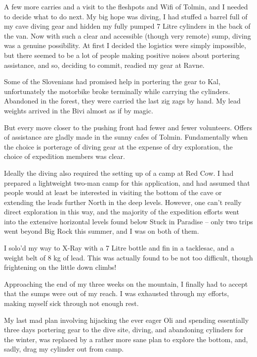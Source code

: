 A few more carries and a visit to the fleshpots and Wifi of Tolmin, and
I needed to decide what to do next. My big hope was diving, I had
stuffed a barrel full of my cave diving gear and hidden my fully pumped
7 Litre cylinders in the back of the van. Now with such a clear and
accessible (though very remote) sump, diving was a genuine possibility.
At first I decided the logistics were simply impossible, but there
seemed to be a lot of people making positive noises about portering
assistance, and so, deciding to commit, readied my gear at Ravne.

Some of the Slovenians had promised help in portering the gear to Kal,
unfortunately the motorbike broke terminally while carrying the
cylinders. Abandoned in the forest, they were carried the last zig zags
by hand. My lead weights arrived in the Bivi almost as if by magic.

But every move closer to the pushing front had fewer and fewer
volunteers. Offers of assistance are gladly made in the sunny cafes of
Tolmin. Fundamentally when the choice is porterage of diving gear at the
expense of dry exploration, the choice of expedition members was clear.

Ideally the diving also required the setting up of a camp at Red Cow. I
had prepared a lightweight two-man camp for this application, and had
assumed that people would at least be interested in visiting the bottom
of the cave or extending the leads further North in the deep levels.
However, one can't really direct exploration in this way, and the
majority of the expedition efforts went into the extensive horizontal
levels found below Stuck in Paradise -- only two trips went beyond Big
Rock this summer, and I was on both of them.

I solo'd my way to X-Ray with a 7 Litre bottle and fin in a tacklesac,
and a weight belt of 8 kg of lead. This was actually found to be not too
difficult, though frightening on the little down climbs!

Approaching the end of my three weeks on the mountain, I finally had to
accept that the sumps were out of my reach. I was exhausted through my
efforts, making myself sick through not enough rest.

My last mad plan involving hijacking the ever eager Oli and spending
essentially three days portering gear to the dive site, diving, and
abandoning cylinders for the winter, was replaced by a rather more sane
plan to explore the bottom, and, sadly, drag my cylinder out from camp.

